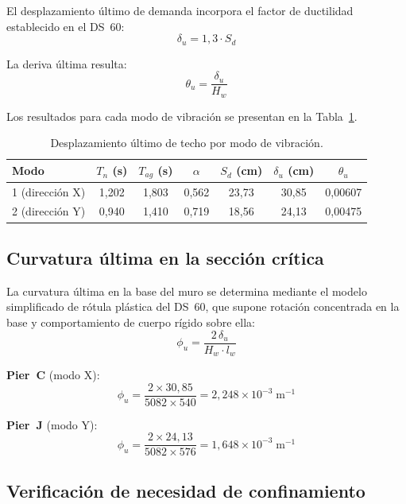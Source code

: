 El desplazamiento último de demanda incorpora el factor de ductilidad establecido en el DS~60:
\begin{equation}
    \delta_u = 1{,}3\cdot S_d
\end{equation}

La deriva última resulta:
\begin{equation}
    \theta_u = \frac{\delta_u}{H_w}
\end{equation}

Los resultados para cada modo de vibración se presentan en la
Tabla~\ref{tab:muro_desplazamiento}.

\begin{table}[H]
\centering
\caption{Desplazamiento último de techo por modo de vibración.}
\label{tab:muro_desplazamiento}
\begin{tabular}{lcccccc}
\hline
Modo & $T_n$ (s) & $T_{ag}$ (s) & $\alpha$ & $S_d$ (cm) & $\delta_u$ (cm) & $\theta_u$ \\
\hline
1 (dirección X) & 1,202 & 1,803 & 0,562 & 23,73 & 30,85 & 0,00607 \\
2 (dirección Y) & 0,940 & 1,410 & 0,719 & 18,56 & 24,13 & 0,00475 \\
\hline
\end{tabular}
\end{table}

\subsection{Curvatura última en la sección crítica}

La curvatura última en la base del muro se determina mediante el modelo simplificado de
rótula plástica del DS~60, que supone rotación concentrada en la base y comportamiento de
cuerpo rígido sobre ella:
\begin{equation}
    \phi_u = \frac{2\,\delta_u}{H_w\cdot l_w}
\end{equation}

\textbf{Pier~C} (modo X):
\begin{equation}
    \phi_u = \frac{2 \times 30{,}85}{5082 \times 540} = 2{,}248 \times 10^{-3}\;\text{m}^{-1}
\end{equation}

\textbf{Pier~J} (modo Y):
\begin{equation}
    \phi_u = \frac{2 \times 24{,}13}{5082 \times 576} = 1{,}648 \times 10^{-3}\;\text{m}^{-1}
\end{equation}

\subsection{Verificación de necesidad de confinamiento}

